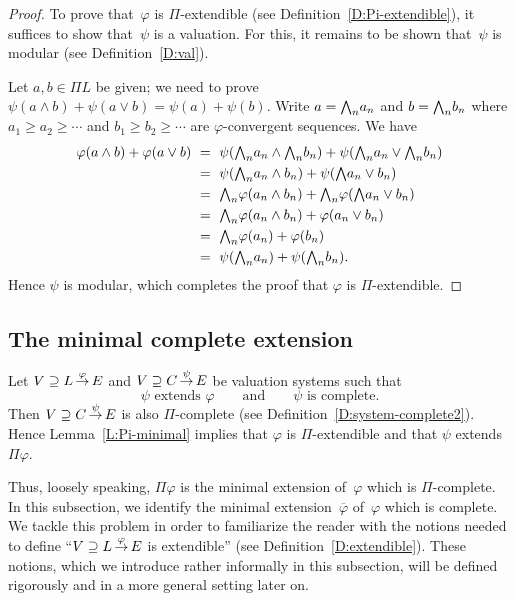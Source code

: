 \documentclass[main.tex]{subfiles}
\begin{document}
\begin{proof}
To prove that~$\varphi$ is $\Pi$-extendible
(see Definition~\ref{D:Pi-extendible}),
it suffices to show that~$\psi$ is a valuation.
For this,
it remains to be shown that~$\psi$ is modular
(see Definition~\ref{D:val}).

Let $a,b\in \Pi L$ be given; 
we need to prove $\psi(a\wedge b) + \psi(a\vee b)= \psi(a)+\psi(b)$.
Write  $a = \textstyle{\bigwedge}_n a_n$ and $b = \textstyle{\bigwedge}_n b_n$
where 
 $a_1 \geq a_2 \geq \dotsb$ and $b_1 \geq b_2 \geq \dotsb$
are $\varphi$-convergent sequences.
We have
\begin{alignat*}{3}
\varphi(a\wedge b) + \varphi(a \vee b) 
\ &=\ \psi(\textstyle{\bigwedge}_n a_n \wedge \textstyle{\bigwedge}_n b_n) + \psi(\textstyle{\bigwedge}_n a_n \vee \textstyle{\bigwedge}_n b_n) \\
\ &=\ \psi(\textstyle{\bigwedge}_n a_n \wedge b_n) + \psi(\textstyle{\bigwedge} a_n \vee b_n) \\
  &=\ \textstyle{\bigwedge}_n \varphi(a_n \wedge b_n) + \textstyle{\bigwedge}_n \varphi(\textstyle{\bigwedge} a_n \vee b_n) \\
  &=\ \textstyle{\bigwedge}_n \varphi(a_n \wedge b_n) + \varphi(a_n \vee b_n) \\
  &=\ \textstyle{\bigwedge}_n \varphi(a_n) + \varphi(b_n) \\
  &=\ \psi(\textstyle{\bigwedge}_n a_n) + \psi(\textstyle{\bigwedge}_n b_n).
\end{alignat*}
Hence $\psi$ is modular, which completes the proof
that $\varphi$ is $\Pi$-extendible.
\end{proof}
%
%
\subsection{The minimal complete extension} $\,$\\
Let $V \supseteq L\,\smash{\stackrel{\varphi}{\rightarrow}}\,E$ 
and $V \supseteq C\,\smash{\stackrel{\psi}{\rightarrow}}\,E$
be valuation systems
such that 
\begin{equation*}
\text{$\psi$ extends~$\varphi$}
\qquad\text{and}\qquad
\text{$\psi$ is complete.}
\end{equation*}
Then $V \supseteq C\,\smash{\stackrel{\psi}{\rightarrow}}\,E$ is also $\Pi$-complete
(see Definition~\ref{D:system-complete2}).
Hence Lemma~\ref{L:Pi-minimal}
implies that $\varphi$ is $\Pi$-extendible 
and that $\psi$ extends  $\Pi \varphi$.

Thus, loosely speaking, $\Pi\varphi$ is the minimal extension of~$\varphi$
which is $\Pi$-complete.
In this subsection,
we identify the minimal extension~$\overline \varphi$ of~$\varphi$
which is complete.
We tackle this problem
in order to familiarize
the reader with the notions needed to define
``$V \supseteq L\,\smash{\stackrel{\varphi}{\rightarrow}}\,E$ is extendible''
(see Definition~\ref{D:extendible}).
These notions, which we introduce
 rather informally in this subsection,
will be defined rigorously and in a more general setting later on.
\end{document}
